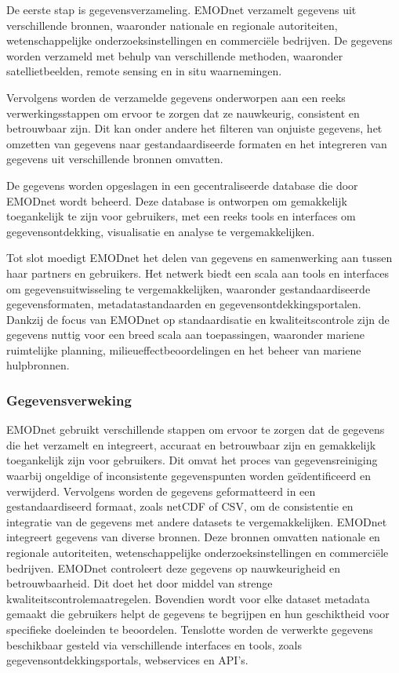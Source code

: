 De eerste stap is gegevensverzameling. EMODnet verzamelt gegevens uit verschillende bronnen, waaronder nationale en regionale autoriteiten, wetenschappelijke onderzoeksinstellingen en commerciële bedrijven. De gegevens worden verzameld met behulp van verschillende methoden, waaronder satellietbeelden, remote sensing en in situ waarnemingen.

Vervolgens worden de verzamelde gegevens onderworpen aan een reeks verwerkingsstappen om ervoor te zorgen dat ze nauwkeurig, consistent en betrouwbaar zijn. Dit kan onder andere het filteren van onjuiste gegevens, het omzetten van gegevens naar gestandaardiseerde formaten en het integreren van gegevens uit verschillende bronnen omvatten.

De gegevens worden opgeslagen in een gecentraliseerde database die door EMODnet wordt beheerd. Deze database is ontworpen om gemakkelijk toegankelijk te zijn voor gebruikers, met een reeks tools en interfaces om gegevensontdekking, visualisatie en analyse te vergemakkelijken.

Tot slot moedigt EMODnet het delen van gegevens en samenwerking aan tussen haar partners en gebruikers. Het netwerk biedt een scala aan tools en interfaces om gegevensuitwisseling te vergemakkelijken, waaronder gestandaardiseerde gegevensformaten, metadatastandaarden en gegevensontdekkingsportalen. Dankzij de focus van EMODnet op standaardisatie en kwaliteitscontrole zijn de gegevens nuttig voor een breed scala aan toepassingen, waaronder mariene ruimtelijke planning, milieueffectbeoordelingen en het beheer van mariene hulpbronnen.

\subsubsection{Gegevensverweking}

EMODnet gebruikt verschillende stappen om ervoor te zorgen dat de gegevens die het verzamelt en integreert, accuraat en betrouwbaar zijn en gemakkelijk toegankelijk zijn voor gebruikers. Dit omvat het proces van gegevensreiniging waarbij ongeldige of inconsistente gegevenspunten worden geïdentificeerd en verwijderd. Vervolgens worden de gegevens geformatteerd in een gestandaardiseerd formaat, zoals netCDF of CSV, om de consistentie en integratie van de gegevens met andere datasets te vergemakkelijken. EMODnet integreert gegevens van diverse bronnen. Deze bronnen omvatten nationale en regionale autoriteiten, wetenschappelijke onderzoeksinstellingen en commerciële bedrijven. EMODnet controleert deze gegevens op nauwkeurigheid en betrouwbaarheid. Dit doet het door middel van strenge kwaliteitscontrolemaatregelen. Bovendien wordt voor elke dataset metadata gemaakt die gebruikers helpt de gegevens te begrijpen en hun geschiktheid voor specifieke doeleinden te beoordelen. Tenslotte worden de verwerkte gegevens beschikbaar gesteld via verschillende interfaces en tools, zoals gegevensontdekkingsportals, webservices en API's.


